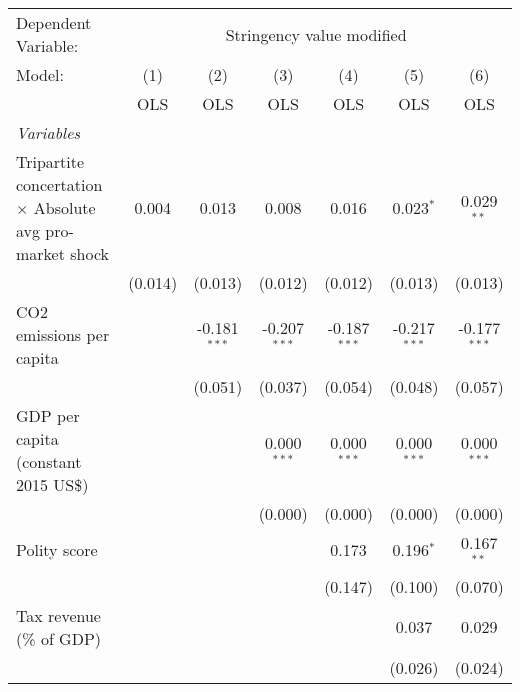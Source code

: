 
\begingroup
\centering
\begin{tabular}{lcccccc}
   \toprule
   Dependent Variable: & \multicolumn{6}{c}{Stringency value modified}\\
   Model:                                                          & (1)     & (2)            & (3)            & (4)            & (5)            & (6)\\  
                                                                   &  OLS    & OLS            & OLS            & OLS            & OLS            & OLS\\  
   \midrule
   \emph{Variables}\\
   Tripartite concertation $\times$ Absolute avg pro-market shock  & 0.004   & 0.013          & 0.008          & 0.016          & 0.023$^{*}$    & 0.029$^{**}$\\   
                                                                   & (0.014) & (0.013)        & (0.012)        & (0.012)        & (0.013)        & (0.013)\\   
   CO2 emissions per capita                                        &         & -0.181$^{***}$ & -0.207$^{***}$ & -0.187$^{***}$ & -0.217$^{***}$ & -0.177$^{***}$\\   
                                                                   &         & (0.051)        & (0.037)        & (0.054)        & (0.048)        & (0.057)\\   
   GDP per capita (constant 2015 US\$)                             &         &                & 0.000$^{***}$  & 0.000$^{***}$  & 0.000$^{***}$  & 0.000$^{***}$\\   
                                                                   &         &                & (0.000)        & (0.000)        & (0.000)        & (0.000)\\   
   Polity score                                                    &         &                &                & 0.173          & 0.196$^{*}$    & 0.167$^{**}$\\   
                                                                   &         &                &                & (0.147)        & (0.100)        & (0.070)\\   
   Tax revenue (\% of GDP)                                         &         &                &                &                & 0.037          & 0.029\\   
                                                                   &         &                &                &                & (0.026)        & (0.024)\\   

\end{tabular}
